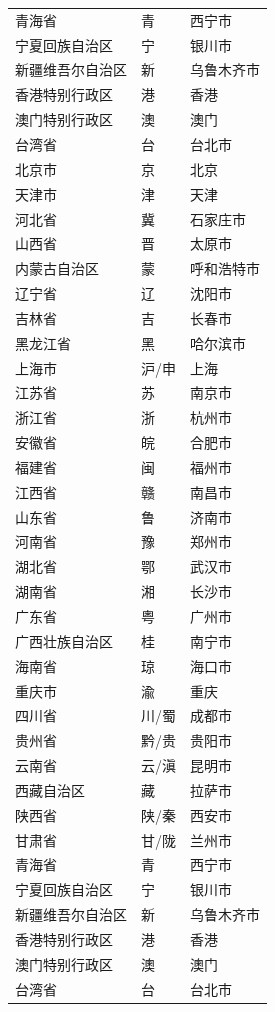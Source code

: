 \begin{longtable}{l@{\hspace{6.5mm}}l@{\hspace{5.5mm}}l}
青海省 & 青 & 西宁市\\
宁夏回族自治区 & 宁 & 银川市\\
新疆维吾尔自治区 & 新 & 乌鲁木齐市\\
香港特别行政区 & 港 & 香港\\
澳门特别行政区 & 澳 & 澳门\\
台湾省 & 台 & 台北市\\
北京市 & 京 & 北京\\
天津市 & 津 & 天津\\
河北省 & 冀 & 石家庄市\\
山西省 & 晋 & 太原市\\
内蒙古自治区 & 蒙 & 呼和浩特市\\
辽宁省 & 辽 & 沈阳市\\
吉林省 & 吉 & 长春市\\
黑龙江省 & 黑 & 哈尔滨市\\
上海市 & 沪/申 & 上海\\
江苏省 & 苏 & 南京市\\
浙江省 & 浙 & 杭州市\\
安徽省 & 皖 & 合肥市\\
福建省 & 闽 & 福州市\\
江西省 & 赣 & 南昌市\\
山东省 & 鲁 & 济南市\\
河南省 & 豫 & 郑州市\\
湖北省 & 鄂 & 武汉市\\
湖南省 & 湘 & 长沙市\\
广东省 & 粤 & 广州市\\
广西壮族自治区 & 桂 & 南宁市\\
海南省 & 琼 & 海口市\\
重庆市 & 渝 & 重庆\\
四川省 & 川/蜀 & 成都市\\
贵州省 & 黔/贵 & 贵阳市\\
云南省 & 云/滇 & 昆明市\\
西藏自治区 & 藏 & 拉萨市\\
陕西省 & 陕/秦 & 西安市\\
甘肃省 & 甘/陇 & 兰州市\\
青海省 & 青 & 西宁市\\
宁夏回族自治区 & 宁 & 银川市\\
新疆维吾尔自治区 & 新 & 乌鲁木齐市\\
香港特别行政区 & 港 & 香港\\
澳门特别行政区 & 澳 & 澳门\\
台湾省 & 台 & 台北市\\
\end{longtable}

